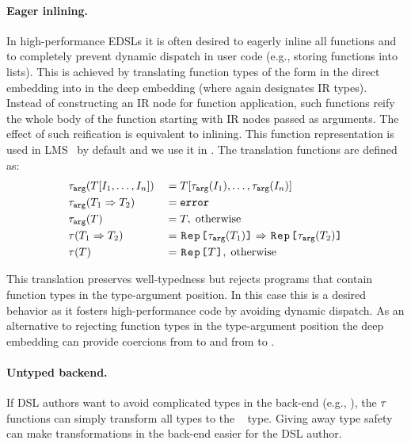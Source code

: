 \paragraph{Eager inlining.} In high-performance EDSLs it is often desired to
eagerly inline all functions and to completely prevent dynamic dispatch in
user code (e.g., storing functions into lists).  This is achieved by translating
function types of the form  in the direct embedding into
 in the deep embedding (where  again
designates IR types). Instead of constructing an IR node for function application, such functions reify the
whole body of the function starting with IR nodes passed as arguments. The effect of such
reification is equivalent to inlining. This function representation is used in LMS~\cite{rompf_lightweight_2012} by default
and we use it in . The translation functions are defined as:
\renewcommand*{\mathellipsis}{%
  \mathinner{{\ldotp}{\ldotp}{\ldotp}}%
}
\begin{alignat*}{3}
&\ttarg[T\lbrack I_1,\ldots,I_n \rbrack]   & \; = \; & T[\ttarg[I_1],\ldots,\ttarg[I_n]] \\
&\ttarg[T_1 \Rightarrow T_2] & \; = \; & \mathtt{error} \\
&\ttarg[T] & \; = \; & T, \; \text{otherwise} \\ %
&\ttother[T_1 \Rightarrow T_2] & \; = \; & \text{\code{Rep[}}\ttarg[T_1]\text{\code{]}} \Rightarrow \text{\code{Rep[}}\ttarg[T_2]\text{\code{]}}\\
&\ttother[T] & \; = \; & \text{\code{Rep[}} T \text{\code{]}},
\; \text{otherwise}
\end{alignat*} %

This translation preserves well-typedness but rejects programs that contain
function types in the type-argument position. In this case this is a desired
behavior as it fosters high-performance code by avoiding dynamic dispatch. As an alternative to rejecting function types in the type-argument position the deep embedding can provide
coercions from  to  and from  to .

\paragraph{Untyped backend.} If DSL authors want to avoid complicated types in the back-end (e.g., ), the $\tau$ functions can simply transform all types to the ~\cite{abadi_dynamic_1991} type. Giving away type safety can make transformations in the back-end easier for the DSL author.

